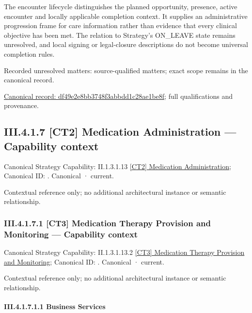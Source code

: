 The encounter lifecycle distinguishes the planned opportunity, presence, active encounter and locally applicable completion context. It supplies an administrative progression frame for care information rather than evidence that every clinical objective has been met. The relation to Strategy's ON\_LEAVE state remains unresolved, and local signing or legal-closure descriptions do not become universal completion rules.


{\small Recorded unresolved matters: source-qualified matters; exact scope remains in the canonical record.}\par
{\footnotesize \href{../../../../../../../continuum/business/business-process/df49e2e8bb3748f3abbdd1c28ae1be8f.md}{Canonical record: df49e2e8bb3748f3abbdd1c28ae1be8f}; full qualifications and provenance.}\par
\subsection*{III.4.1.7 [CT2] Medication Administration — Capability context}
\label{navigation:III.4.1.7}

{\small Canonical Strategy Capability: II.1.3.1.13 \hyperref[element:c907e2a95629435b9951941ad4e2ebe9]{[CT2] Medication Administration}; Canonical ID: \texttt{}. Canonical · current.}\par
Contextual reference only; no additional architectural instance or semantic relationship.\par
\subsubsection*{III.4.1.7.1 [CT3] Medication Therapy Provision and Monitoring — Capability context}
\label{navigation:III.4.1.7.1}

{\small Canonical Strategy Capability: II.1.3.1.13.2 \hyperref[element:d1821b4f6d5746f9a697dfe3b792a186]{[CT3] Medication Therapy Provision and Monitoring}; Canonical ID: \texttt{}. Canonical · current.}\par
Contextual reference only; no additional architectural instance or semantic relationship.\par
\paragraph*{III.4.1.7.1.1 Business Services}
\label{navigation:III.4.1.7.1.1}

